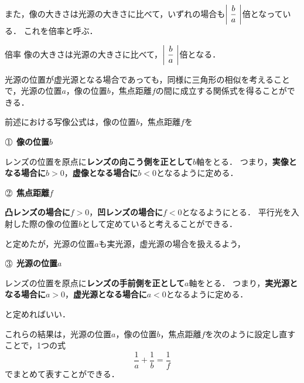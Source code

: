  また，像の大きさは光源の大きさに比べて，いずれの場合も$\left| \hspace{1mm} \dfrac{b}{a} \hspace{1mm} \right|$倍となっている．
 これを倍率と呼ぶ．
 
  \begin{matome}{倍率}
像の大きさは光源の大きさに比べて，$\left| \hspace{1mm}\dfrac{b}{a} \hspace{1mm}\right|$倍となる．
 \end{matome}
 
 光源の位置が虚光源となる場合であっても，同様に三角形の相似を考えることで，光源の位置$a$，像の位置$b$，焦点距離$f$の間に成立する関係式を得ることができる．
 
 前述における写像公式は，像の位置$b$，焦点距離$f$を\vspace{5mm}

$\MARU{1}$\hspace{2mm} {\bf 像の位置}\mbox{\boldmath$b$}

レンズの位置を原点に{\bf レンズの向こう側を正として}$b$軸をとる．
つまり，{\bf 実像となる場合に}\mbox{\boldmath$b>0$}，{\bf 虚像となる場合に}\mbox{\boldmath$b<0$}となるように定める．

$\MARU{2}$\hspace{2mm} {\bf 焦点距離}\mbox{\boldmath$f$}

{\bf 凸レンズの場合に}\mbox{\boldmath$f>0$}，{\bf 凹レンズの場合に}\mbox{\boldmath$f<0$}となるようにとる．
平行光を入射した際の像の位置$b$として定めていると考えることができる．\vspace{5mm}

と定めたが，光源の位置$a$も実光源，虚光源の場合を扱えるよう，\vspace{5mm}

$\MARU{3}$\hspace{2mm} {\bf 光源の位置}\mbox{\boldmath$a$}

レンズの位置を原点に{\bf レンズの手前側を正として}$a$軸をとる．
つまり，{\bf 実光源となる場合に}\mbox{\boldmath$a>0$}，{\bf 虚光源となる場合に}\mbox{\boldmath$a<0$}となるように定める．\vspace{5mm}

と定めればいい．

これらの結果は，光源の位置$a$，像の位置$b$，焦点距離$f$を次のように設定し直すことで，1つの式
\[ \dfrac{1}{a}+\dfrac{1}{b}=\dfrac{1}{f}\]
でまとめて表すことができる．

